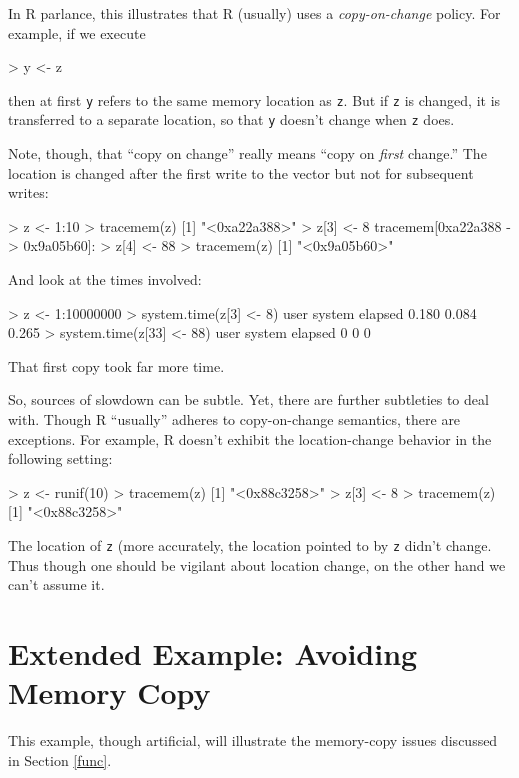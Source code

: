 In R parlance, this illustrates that R (usually) uses a {\it
copy-on-change} policy.  For example, if we execute

\begin{Code}
> y <- z
\end{Code}

\noindent
then at first {\tt y} refers to the same memory location as {\tt z}.
But if {\tt z} is changed, it is transferred to a separate location, so
that {\tt y} doesn't change when {\tt z} does.

Note, though, that ``copy on change'' really means ``copy on {\it first}
change.''  The location is changed after the first write to the vector
but not for subsequent writes:

\begin{Code}
> z <- 1:10
> tracemem(z)
[1] "<0xa22a388>"
> z[3] <- 8
tracemem[0xa22a388 -> 0x9a05b60]: 
> z[4] <- 88
> tracemem(z)
[1] "<0x9a05b60>"
\end{Code}

And look at the times involved:

\begin{Code}
> z <- 1:10000000
> system.time(z[3] <- 8)  
   user  system elapsed 
  0.180   0.084   0.265 
> system.time(z[33] <- 88)
   user  system elapsed 
      0       0       0 
\end{Code}

\noindent
That first copy took far more time.

So, sources of slowdown can be subtle.  Yet, there are further
subtleties to deal with.  Though R ``usually'' adheres to copy-on-change
semantics, there are exceptions.  For example, R doesn't exhibit the
location-change behavior in the following setting:

\begin{Code}
> z <- runif(10)
> tracemem(z)
[1] "<0x88c3258>"
> z[3] <- 8
> tracemem(z)
[1] "<0x88c3258>"
\end{Code}

\noindent
The location of {\tt z} (more accurately, the location pointed to by
{\tt z} didn't change.  Thus though one should be vigilant about 
location change, on the other hand we can't assume it.

\section{Extended Example:  Avoiding Memory Copy}  

This example, though artificial, will illustrate the memory-copy issues
discussed in Section \ref{func}.


